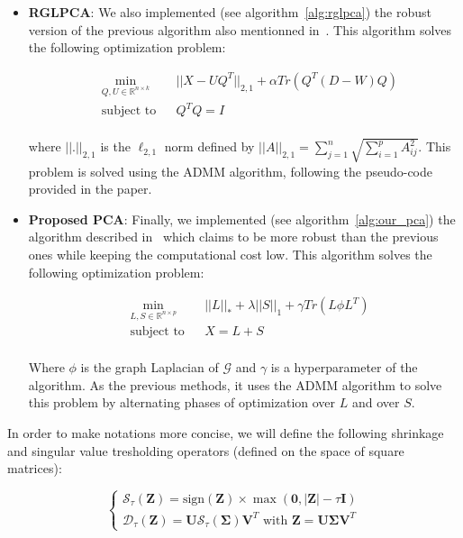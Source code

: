 \documentclass[sigconf]{acmart}
\newcommand{\sign}{\text{sign}}
\begin{document}
\begin{itemize}
  \item \textbf{RGLPCA}: We also implemented (see algorithm~\ref{alg:rglpca}) the robust version of the previous algorithm also mentionned in~\cite{glpca_paper}. This algorithm solves the following optimization problem:
  
  \begin{equation*}
    \begin{aligned}
    & \underset{Q, U \in \mathbb{R}^{n \times k}}{\min}
    & & ||X - UQ^T||_{2, 1} + \alpha Tr(Q^T (D-W) Q) \\
    & \text{subject to}
    & & Q^TQ = I \\
    \end{aligned}
  \end{equation*}

  where $||.||_{2, 1}$ is the $\ell_{2, 1}$ norm defined by $||A||_{2, 1} = \sum\limits_{j=1}^n \sqrt{\sum \limits_{i=1}^p A_{ij}^2}$. This problem is solved using the ADMM algorithm, following the pseudo-code provided in the paper.
  
  \item \textbf{Proposed PCA}: Finally, we implemented (see algorithm~\ref{alg:our_pca}) the algorithm described in~\cite{main_paper} which claims to be more robust than the previous ones while keeping the computational cost low. This algorithm solves the following optimization problem:
  
  \begin{equation*}
    \begin{aligned}
    & \underset{L, S \in \mathbb{R}^{n \times p}}{\min}
    & & ||L||_* + \lambda ||S||_1 + \gamma Tr(L \phi L^T) \\
    & \text{subject to}
    & & X = L + S \\
    \end{aligned}
  \end{equation*}

  Where $\phi$ is the graph Laplacian of $\mathcal{G}$ and $\gamma$ is a hyperparameter of the algorithm. As the previous methods, it uses the ADMM algorithm to solve this problem by alternating phases of optimization over $L$ and over $S$.

\end{itemize}
 
In order to make notations more concise, we will define the following shrinkage and singular value tresholding operators (defined on the space of square matrices):

\begin{equation*}
  \begin{cases}
    \mathcal{S}_{\tau}(\mathbf{Z}) = \sign{(\mathbf{Z})} \times \max{(\mathbf{0}, |\mathbf{Z}| - \tau \mathbf{I})} \\
      \mathcal{D}_{\tau}(\mathbf{Z}) = \mathbf{U} \mathcal{S}_{\tau}(\mathbf{\Sigma}) \mathbf{V}^T \text{ with } \mathbf{Z} = \mathbf{U} \mathbf{\Sigma} \mathbf{V}^T
  \end{cases}
\end{equation*}
\end{document}
